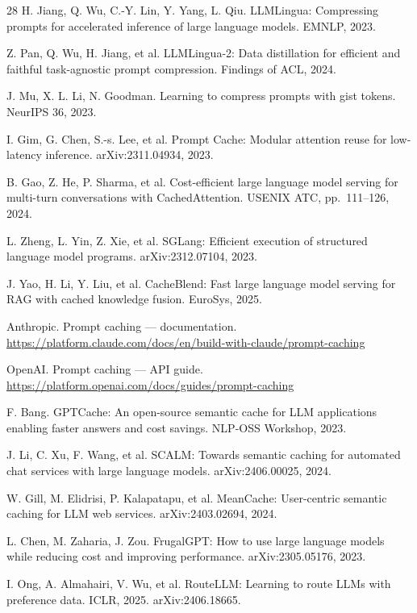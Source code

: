 \documentclass[11pt,a4paper]{article}
\begin{document}
\begin{thebibliography}{28}
 H. Jiang, Q. Wu, C.-Y. Lin, Y. Yang, L. Qiu. LLMLingua: Compressing prompts
for accelerated inference of large language models. EMNLP, 2023.

 Z. Pan, Q. Wu, H. Jiang, et al. LLMLingua-2: Data distillation for efficient
and faithful task-agnostic prompt compression. Findings of ACL, 2024.

 J. Mu, X. L. Li, N. Goodman. Learning to compress prompts with gist tokens.
NeurIPS 36, 2023.

 I. Gim, G. Chen, S.-s. Lee, et al. Prompt Cache: Modular attention reuse
for low-latency inference. arXiv:2311.04934, 2023.

 B. Gao, Z. He, P. Sharma, et al. Cost-efficient large language model serving
for multi-turn conversations with CachedAttention. USENIX ATC, pp.~111--126, 2024.

 L. Zheng, L. Yin, Z. Xie, et al. SGLang: Efficient execution of structured
language model programs. arXiv:2312.07104, 2023.

 J. Yao, H. Li, Y. Liu, et al. CacheBlend: Fast large language model serving
for RAG with cached knowledge fusion. EuroSys, 2025.

 Anthropic. Prompt caching --- documentation.
\url{https://platform.claude.com/docs/en/build-with-claude/prompt-caching}

 OpenAI. Prompt caching --- API guide.
\url{https://platform.openai.com/docs/guides/prompt-caching}

 F. Bang. GPTCache: An open-source semantic cache for LLM applications enabling
faster answers and cost savings. NLP-OSS Workshop, 2023.

 J. Li, C. Xu, F. Wang, et al. SCALM: Towards semantic caching for automated chat
services with large language models. arXiv:2406.00025, 2024.

 W. Gill, M. Elidrisi, P. Kalapatapu, et al. MeanCache: User-centric semantic
caching for LLM web services. arXiv:2403.02694, 2024.

 L. Chen, M. Zaharia, J. Zou. FrugalGPT: How to use large language models
while reducing cost and improving performance. arXiv:2305.05176, 2023.

 I. Ong, A. Almahairi, V. Wu, et al. RouteLLM: Learning to route LLMs with
preference data. ICLR, 2025. arXiv:2406.18665.


\end{thebibliography}
\end{document}
